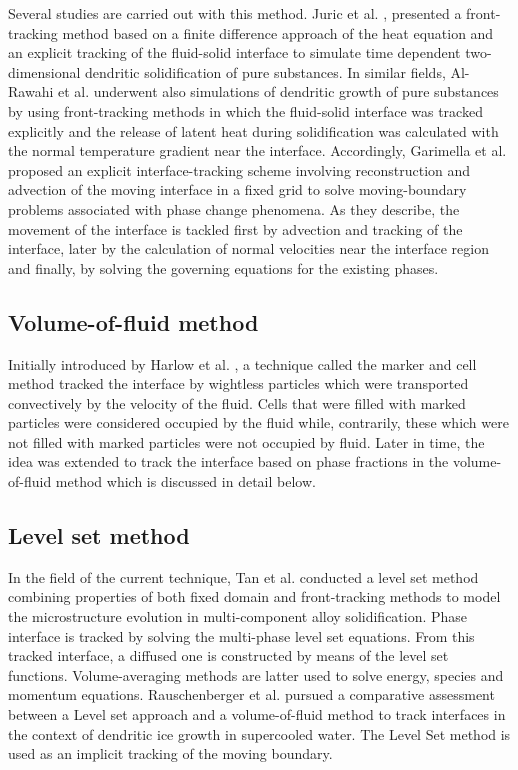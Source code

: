 \setlength{\parindent}{0.5cm} Several studies are carried out with this method. Juric et al. \cite{juric_tryggvason_1996}, presented a front-tracking method based on a finite difference approach of the heat equation and an explicit tracking of the fluid-solid interface to simulate time dependent two-dimensional dendritic solidification of pure substances. In similar fields, Al-Rawahi et al. \cite{al-rawahi_tryggvason_2002} underwent also simulations of dendritic growth of pure substances by using front-tracking methods in which the fluid-solid interface was tracked explicitly and the release of latent heat during solidification was calculated with the normal temperature gradient near the interface. Accordingly, Garimella et al. \cite{li_garimella_simpson_2003} proposed an explicit interface-tracking scheme involving reconstruction and advection of the moving interface in a fixed grid to solve moving-boundary problems associated with phase change phenomena. As they describe, the movement of the interface is tackled first by advection and tracking of the interface, later by the calculation of normal velocities near the interface region and finally, by solving the governing equations for the existing phases.

\subsection*{Volume-of-fluid method}

\setlength{\parindent}{0.5cm} Initially introduced by Harlow et al. \cite{harlow_welch_1965}, a technique called the marker and cell method tracked the interface by wightless particles which were transported convectively by the velocity of the fluid. Cells that were filled with marked particles were considered occupied by the fluid while, contrarily, these which were not filled with marked particles were not occupied by fluid. Later in time, the idea was extended to track the interface based on phase fractions in the volume-of-fluid method which is discussed in detail below.

\subsection*{Level set method}

\setlength{\parindent}{0.5cm} In the field of the current technique, Tan et al. \cite{tan_zabaras_2007} conducted a level set method combining properties of both fixed domain and front-tracking methods to model the microstructure evolution in multi-component alloy solidification. Phase interface is tracked by solving the multi-phase level set equations. From this tracked interface, a diffused one is constructed by means of the level set functions. Volume-averaging methods are latter used to solve energy, species and momentum equations.  Rauschenberger et al. \cite{rauschenberger_criscione_eisenschmidt_kintea_jakirlic_tukovic_roisman_weigand_tropea_2013} pursued a comparative assessment between a Level set approach and a volume-of-fluid method to track interfaces in the context of dendritic ice growth in supercooled water. The Level Set method is used as an implicit tracking of the moving boundary.

